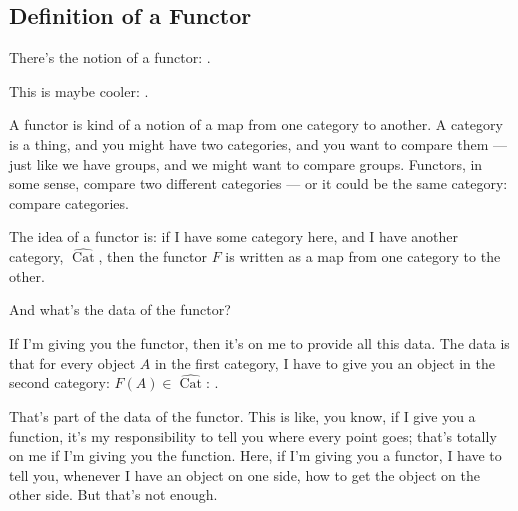 \subsection{Definition of a Functor}

\begin{speech}[01:22:27 - 01:23:55]
There's the notion of a functor: .

This is maybe cooler: .

A functor is kind of a notion of a map from one category to another. A category is a thing, and you might have two categories, and you want to compare them --- just like we have groups, and we might want to compare groups. Functors, in some sense, compare two different categories  --- or it could be the same category: compare categories.

The idea of a functor is: if I have some category here, and I have another category, $\widehat{\operatorname{Cat}}$,  then the functor $F$ is written as a map from one category to the other.

And what's the data of the functor? 

If I'm giving you the functor, then it's on me to provide all this data. The data is that for every object $A$ in the first category,  I have to give you an object in the second category: $F(A) \in \widehat{\operatorname{Cat}}$: .

That's part of the data of the functor. This is like, you know, if I give you a function, it's my responsibility to tell you where every point goes; that's totally on me if I'm giving you the function. Here, if I'm giving you a functor, I have to tell you, whenever I have an object on one side, how to get the object on the other side. But that's not enough.
\end{speech}

